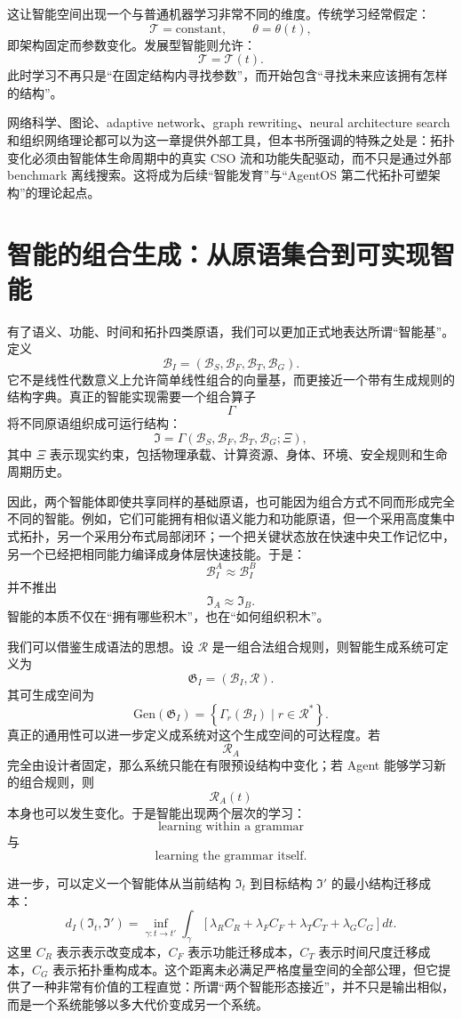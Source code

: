 这让智能空间出现一个与普通机器学习非常不同的维度。传统学习经常假定：
\[
\mathcal T=\mathrm{constant},
\qquad
\theta=\theta(t),
\]
即架构固定而参数变化。发展型智能则允许：
\[
\mathcal T=\mathcal T(t).
\]
此时学习不再只是“在固定结构内寻找参数”，而开始包含“寻找未来应该拥有怎样的结构”。

网络科学、图论、adaptive network、graph rewriting、neural architecture search 和组织网络理论都可以为这一章提供外部工具，但本书所强调的特殊之处是：拓扑变化必须由智能体生命周期中的真实 CSO 流和功能失配驱动，而不只是通过外部 benchmark 离线搜索。这将成为后续“智能发育”与“AgentOS 第二代拓扑可塑架构”的理论起点。

\section{智能的组合生成：从原语集合到可实现智能}

有了语义、功能、时间和拓扑四类原语，我们可以更加正式地表达所谓“智能基”。定义
\[
\boxed{
\mathcal B_I
=
\left(
\mathcal B_S,
\mathcal B_F,
\mathcal B_T,
\mathcal B_G
\right).
}
\]
它不是线性代数意义上允许简单线性组合的向量基，而更接近一个带有生成规则的结构字典。真正的智能实现需要一个组合算子
\[
\Gamma
\]
将不同原语组织成可运行结构：
\[
\boxed{
\mathfrak I
=
\Gamma
\left(
\mathcal B_S,
\mathcal B_F,
\mathcal B_T,
\mathcal B_G;
\Xi
\right),
}
\]
其中 $\Xi$ 表示现实约束，包括物理承载、计算资源、身体、环境、安全规则和生命周期历史。

因此，两个智能体即使共享同样的基础原语，也可能因为组合方式不同而形成完全不同的智能。例如，它们可能拥有相似语义能力和功能原语，但一个采用高度集中式拓扑，另一个采用分布式局部闭环；一个把关键状态放在快速中央工作记忆中，另一个已经把相同能力编译成身体层快速技能。于是：
\[
\mathcal B_I^A
\approx
\mathcal B_I^B
\]
并不推出
\[
\mathfrak I_A
\approx
\mathfrak I_B.
\]
智能的本质不仅在“拥有哪些积木”，也在“如何组织积木”。

我们可以借鉴生成语法的思想。设 $\mathcal R$ 是一组合法组合规则，则智能生成系统可定义为
\[
\mathfrak G_I
=
(\mathcal B_I,\mathcal R).
\]
其可生成空间为
\[
\mathrm{Gen}(\mathfrak G_I)
=
\left\{
\Gamma_r(\mathcal B_I)
\mid
r\in\mathcal R^*
\right\}.
\]
真正的通用性可以进一步定义成系统对这个生成空间的可达程度。若
\[
\mathcal R_A
\]
完全由设计者固定，那么系统只能在有限预设结构中变化；若 Agent 能够学习新的组合规则，则
\[
\mathcal R_A(t)
\]
本身也可以发生变化。于是智能出现两个层次的学习：
\[
\text{learning within a grammar}
\]
与
\[
\text{learning the grammar itself}.
\]

进一步，可以定义一个智能体从当前结构 $\mathfrak I_t$ 到目标结构 $\mathfrak I'$ 的最小结构迁移成本：
\[
d_I(\mathfrak I_t,\mathfrak I')
=
\inf_{\gamma:t\rightarrow t'}
\int_{\gamma}
\left[
\lambda_R C_R
+
\lambda_F C_F
+
\lambda_T C_T
+
\lambda_G C_G
\right]dt.
\]
这里 $C_R$ 表示表示改变成本，$C_F$ 表示功能迁移成本，$C_T$ 表示时间尺度迁移成本，$C_G$ 表示拓扑重构成本。这个距离未必满足严格度量空间的全部公理，但它提供了一种非常有价值的工程直觉：所谓“两个智能形态接近”，并不只是输出相似，而是一个系统能够以多大代价变成另一个系统。

